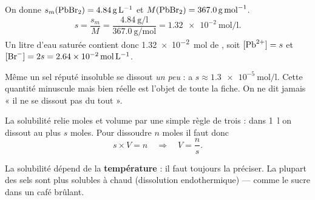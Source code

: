 \documentclass[11pt,a4paper]{article}
\begin{document}
\begin{exemplebox}
On donne $s_m(\ce{PbBr2})=\qty{4.84}{\gram\per\litre}$ et $M(\ce{PbBr2})=\qty{367.0}{\gram\per\mole}$.
\[ s = \dfrac{s_m}{M} = \dfrac{\qty{4.84}{\gram\per\litre}}{\qty{367.0}{\gram\per\mole}}
     = \qty{1.32e-2}{\mole\per\litre}. \]
Un litre d'eau saturée contient donc \qty{1.32e-2}{\mole} de , soit $[\ce{Pb^{2+}}]=s$ et
$[\ce{Br-}]=2s=\qty{2.64e-2}{\mole\per\litre}$.
\end{exemplebox}

\begin{piege}
Même un sel réputé insoluble se dissout \emph{un peu} :  a $s\approx\qty{1.3e-5}{\mole\per\litre}$.
Cette quantité minuscule mais bien réelle est l'objet de toute la fiche. On ne dit jamais « il ne se
dissout pas du tout ».
\end{piege}

\begin{methode}
La solubilité relie moles et volume par une simple règle de trois : dans \qty{1}{\litre} on dissout au
plus $s$ moles. Pour dissoudre $n$ moles il faut donc
\[ s\times V = n \quad\Longrightarrow\quad V = \dfrac{n}{s}. \]
\end{methode}

\begin{remarque}
La solubilité dépend de la \textbf{température} : il faut toujours la préciser. La plupart des sels sont
plus solubles à chaud (dissolution endothermique) — comme le sucre dans un café brûlant.
\end{remarque}
\end{document}
